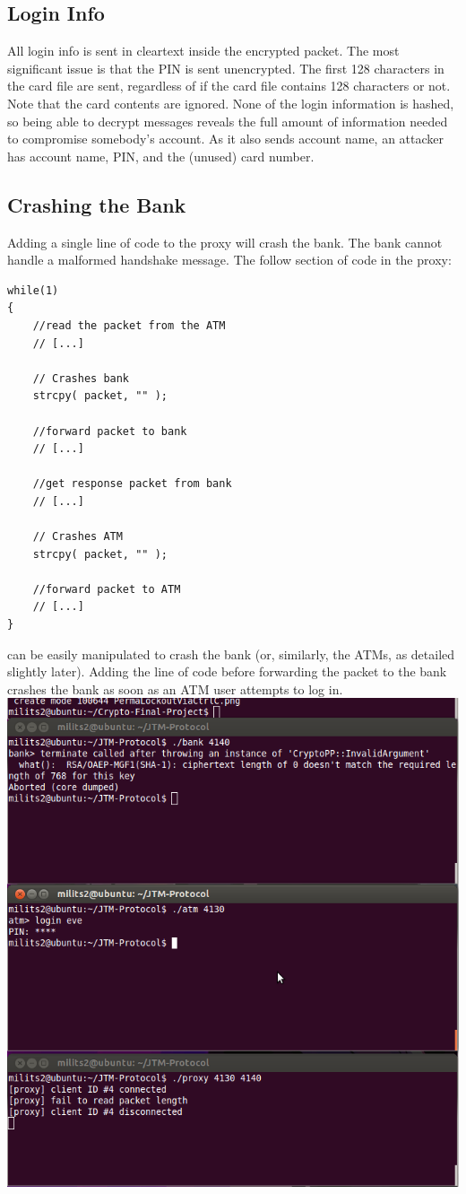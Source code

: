 \documentclass{article}
\begin{document}
\subsection{Login Info}

All login info is sent in cleartext inside the encrypted packet. The most 
significant issue is that the PIN is sent unencrypted. The first 128 characters 
in the card file are sent, regardless of if the card file contains 128 characters 
or not. Note that the card contents are ignored. 
None of the login information is hashed, so being able to decrypt messages reveals 
the full amount of information needed to compromise somebody's account. As it also 
sends account name, an attacker has account name, PIN, and the (unused) card number.

\subsection{Crashing the Bank}
Adding a single line of code to the proxy will crash the bank. The bank cannot handle a malformed handshake message. The follow section of code in the proxy:
\begin{lstlisting}
while(1)
{
	//read the packet from the ATM
    // [...]
	
	// Crashes bank
    strcpy( packet, "" );
    
	//forward packet to bank
    // [...]
	
	//get response packet from bank
    // [...]
	
	// Crashes ATM
	strcpy( packet, "" );
	
	//forward packet to ATM
    // [...]
}
\end{lstlisting}
can be easily manipulated to crash the bank (or, similarly, the ATMs, as detailed slightly later). Adding the line of code before forwarding the packet to the bank crashes the bank as soon as an ATM user attempts to log in. 
\\
\includegraphics[scale=0.5]{crashBank.png}
\end{document}
